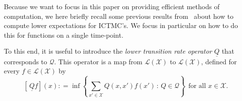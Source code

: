 \documentclass[twoside,11pt]{article}
\newcommand{\reals}{\mathbb{R}}
\newcommand{\states}{\mathcal{X}}
\newcommand{\gambles}{\mathcal{L}}
\newcommand{\gamblesX}{\gambles(\states)}
\newcommand{\rateset}{\mathcal{Q}}
\newcommand{\lrate}{\underline{Q}}
\newcommand{\coloneqq}{:\!=}
\begin{document}
Because we want to focus in this paper on providing efficient methods of computation, we here briefly recall some previous results from~\citet{krak2016ictmc} about how to compute lower expectations for ICTMC's. We focus in particular on how to do this for functions on a single time-point. %

To this end, it is useful to introduce the \emph{lower transition rate operator} $\lrate$ that corresponds to $\rateset$. This operator is a map from $\gamblesX$ to $\gamblesX$, defined for every $f\in\gamblesX$ by
\begin{equation}\label{eq:lower_rate_is_inf}
\left[\,\lrate f\right](x) \coloneqq \inf\left\{ \sum_{x'\in\states}Q(x,x')f(x')\,:\, Q\in\rateset \right\}
~~\text{for all $x\in\states$}.
\end{equation}
\end{document}
